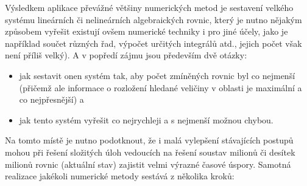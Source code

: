   Výsledkem aplikace převážné většiny numerických metod je sestavení velkého systému lineárních či
  nelineárních algebraických rovnic, který je nutno nějakým způsobem vyřešit existují ovšem
  numerické techniky i pro jiné účely, jako je například součet různých řad, výpočet určitých
  integrálů atd., jejich počet však není příliš velký). A v popředí zájmu jsou především dvě
  otázky:
  \begin{itemize}
    \item jak sestavit onen systém tak, aby počet zmíněných rovnic byl co nej\-men\-ší (přičemž ale
          informace o rozložení hledané veličiny v oblasti je maximální a co nejpřesnější) a
    \item jak tento systém vyřešit co nejrychleji a s nejmenší možnou chybou.
  \end{itemize}
  Na tomto místě je nutno podotknout, že i malá vylepšení stávajících postupů mohou při řešení
  složitých úloh vedoucích na řešení soustav milionů či desítek milionů rovnic (aktuální stav)
  zajistit velmi výrazné časové úspory. Samotná realizace jakékoli numerické metody sestává z
  několika kroků:
